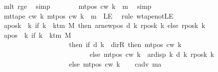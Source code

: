 \begin{isabellebody}
\ mlt\ rge\ \isamarkupfalse%
\ simp\isanewline
\ \ \ \ \isamarkupfalse%
\ {\isachardoublequoteopen}{}\ {\isasymle}\ mt{\isacharunderscore}{\kern0pt}pos\ c{\isacharunderscore}{\kern0pt}w\ k\ {\isacharminus}{\kern0pt}\ m{\isachardoublequoteclose}\ \isamarkupfalse%
\ simp\isanewline
\ \ \ \ \isamarkupfalse%
\ {\isachardoublequoteopen}mt{\isacharunderscore}{\kern0pt}tape\ c{\isacharunderscore}{\kern0pt}w\ k\ {\isacharparenleft}{\kern0pt}mt{\isacharunderscore}{\kern0pt}pos\ c{\isacharunderscore}{\kern0pt}w\ k\ {\isacharminus}{\kern0pt}\ m{\isacharparenright}{\kern0pt}\ {\isasymnoteq}\ LE{}{\isachardoublequoteclose}\ \isamarkupfalse%
\ {\isacharparenleft}{\kern0pt}rule\ wtape{\isacharunderscore}{\kern0pt}notLE{\isacharparenright}{\kern0pt}\isanewline
\ \ \isamarkupfalse%
\isanewline
\ \ \isamarkupfalse%
\ {\isacharquery}{\kern0pt}aposk\ {\isacharequal}{\kern0pt}\ {\isachardoublequoteopen}{\isasymlambda}k{\isachardot}{\kern0pt}\ if\ k\ {\isacharless}{\kern0pt}\ k{\isacharunderscore}{\kern0pt}tm\ M\ then\ ar{\isacharunderscore}{\kern0pt}newpos\ {\isacharparenleft}{\kern0pt}d\ k{\isacharparenright}{\kern0pt}\ {\isacharparenleft}{\kern0pt}{\isacharquery}{\kern0pt}rposk\ k{\isacharparenright}{\kern0pt}\ else\ {\isacharquery}{\kern0pt}rposk\ k{\isachardoublequoteclose}\isanewline
\ \ \isamarkupfalse%
\ {\isacharquery}{\kern0pt}apos\ {\isacharequal}{\kern0pt}\ {\isachardoublequoteopen}{\isasymlambda}k{\isachardot}{\kern0pt}\ if\ k\ {\isacharless}{\kern0pt}\ k{\isacharunderscore}{\kern0pt}tm\ M\isanewline
\ \ \ \ \ \ \ \ \ \ \ \ \ \ \ \ \ \ \ \ then\ {\isacharparenleft}{\kern0pt}if\ d\ k\ {\isacharequal}{\kern0pt}\ dir{\isachardot}{\kern0pt}R\ then\ mt{\isacharunderscore}{\kern0pt}pos\ c{\isacharunderscore}{\kern0pt}w\ k\isanewline
\ \ \ \ \ \ \ \ \ \ \ \ \ \ \ \ \ \ \ \ \ \ \ \ \ \ else\ mt{\isacharunderscore}{\kern0pt}pos\ c{\isacharunderscore}{\kern0pt}w\ k\ {\isacharminus}{\kern0pt}\ ar{\isacharunderscore}{\kern0pt}disp\ {\isacharquery}{\kern0pt}k\ {\isacharparenleft}{\kern0pt}d\ k{\isacharparenright}{\kern0pt}\ {\isacharparenleft}{\kern0pt}{\isacharquery}{\kern0pt}rposk\ k{\isacharparenright}{\kern0pt}{\isacharparenright}{\kern0pt}\isanewline
\ \ \ \ \ \ \ \ \ \ \ \ \ \ \ \ \ \ \ \ else\ mt{\isacharunderscore}{\kern0pt}pos\ c{\isacharunderscore}{\kern0pt}w\ k{\isachardoublequoteclose}\isanewline
\ \ \isamarkupfalse%
\ c{\isacharunderscore}{\kern0pt}adv\ m{\isacharunderscore}{\kern0pt}a\ \isanewline

\end{isabellebody}
